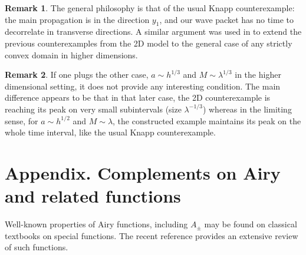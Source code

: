 \documentclass[11pt]{article}
\theoremstyle{plain}
\theoremstyle{definition}
\newtheorem{rmq}{Remark}[section]
\begin{document}
\begin{rmq}
The general philosophy is that of the usual Knapp counterexample: the main propagation is in the direction $y_{1}$, and our wave packet has no time to decorrelate in transverse directions. A similar argument was used in \cite{doi2} to extend the previous counterexamples from the 2D model to the general case of any strictly convex domain in higher dimensions.
\end{rmq}
\begin{rmq}
If one plugs the other case, $a\sim h^{1/3}$ and $M\sim \lambda^{1/3}$ in the higher dimensional setting, it does not provide any interesting condition. The main difference appears to be that in that later case, the 2D counterexample is reaching its peak on very small subintervals (size $\lambda^{-1/3}$) whereas in the limiting sense, for $a\sim h^{1/2}$ and $M\sim \lambda$, the constructed example maintains its peak on the whole time interval, like the usual Knapp counterexample.
\end{rmq}

\appendix
{}
\section*{Appendix. Complements on Airy and related functions}
Well-known properties of Airy functions, including $A_{\pm}$ may be found on classical textbooks on special functions. The recent reference \cite{AFbook} provides an extensive review of such functions.
\end{document}
